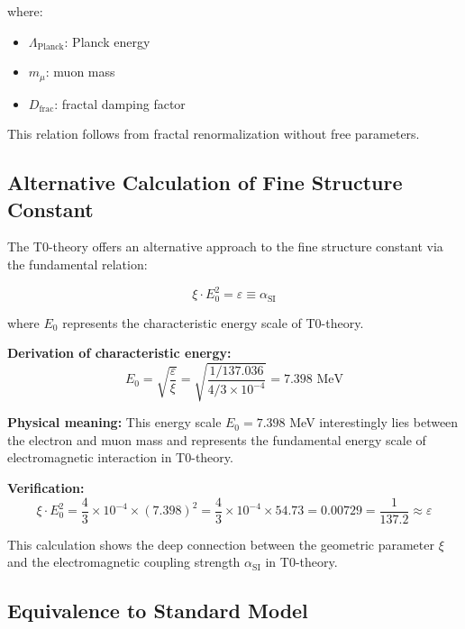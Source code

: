 \documentclass[12pt,a4paper]{article}
\numberwithin{equation}{section}
\newcommand{\xipar}{\xi}
\newcommand{\epsilonT}{\varepsilon}
\newcommand{\alphaSI}{\alpha_{\text{SI}}}
\newcommand{\Eo}{E_0}
\begin{document}
	where:
	\begin{itemize}
		\item $\Lambda_{\text{Planck}}$: Planck energy
		\item $m_\mu$: muon mass  
		\item $D_{\text{frac}}$: fractal damping factor
	\end{itemize}
	
	This relation follows from fractal renormalization without free parameters.
	
	\subsection{Alternative Calculation of Fine Structure Constant}
	
	The T0-theory offers an alternative approach to the fine structure constant via the fundamental relation:
	
	\begin{equation}
		\xipar \cdot \Eo^2 = \epsilonT \equiv \alphaSI
		\label{eq:alpha_alternative}
	\end{equation}
	
	where $\Eo$ represents the characteristic energy scale of T0-theory.
	
	\textbf{Derivation of characteristic energy:}
	\begin{equation}
		\Eo = \sqrt{\frac{ \epsilonT}{\xipar}} = \sqrt{\frac{1/137.036}{4/3 \times 10^{-4}}} = 7.398 \text{ MeV}
		\label{eq:e0_derivation}
	\end{equation}
	
	\textbf{Physical meaning:}
	This energy scale $\Eo = 7.398$ MeV interestingly lies between the electron and muon mass and represents the fundamental energy scale of electromagnetic interaction in T0-theory.
	
	\textbf{Verification:}
	\begin{equation}
		\xipar \cdot \Eo^2 = \frac{4}{3} \times 10^{-4} \times (7.398)^2 = \frac{4}{3} \times 10^{-4} \times 54.73 = 0.00729 = \frac{1}{137.2} \approx  \epsilonT
		\label{eq:alpha_verification}
	\end{equation}
	
	This calculation shows the deep connection between the geometric parameter $\xipar$ and the electromagnetic coupling strength $\alphaSI$ in T0-theory.
	
	\subsection{Equivalence to Standard Model}
	
\end{document}
